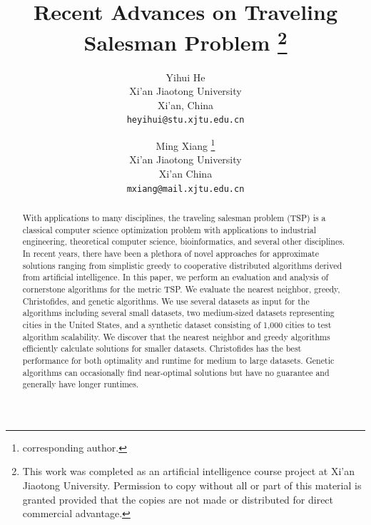 \documentclass[10pt,twocolumn,letterpaper]{article}
\begin{document}
\title{Recent Advances on Traveling Salesman Problem
\thanks{ This work was completed as an artificial intelligence course project at Xi'an Jiaotong University. Permission to copy without all or part of this material is granted provided that the copies are not made or distributed for direct commercial advantage.}
}

\author{Yihui He\\
Xi'an Jiaotong University\\
Xi'an, China\\
{\tt\small heyihui@stu.xjtu.edu.cn}
\and
Ming Xiang
\thanks{corresponding author.}\\
Xi'an Jiaotong University\\
Xi'an China\\
{\tt\small mxiang@mail.xjtu.edu.cn}
}

\maketitle

\begin{abstract}
With applications to many disciplines, the traveling salesman problem (TSP) is a classical computer science optimization problem with applications to industrial engineering, theoretical computer science, bioinformatics, and several other disciplines. In recent years, there have been a
plethora of novel approaches for approximate solutions ranging from simplistic greedy to cooperative distributed algorithms derived from artificial intelligence. In this paper,
we perform an evaluation and analysis of cornerstone algorithms for the metric TSP. We evaluate the nearest neighbor, greedy, Christofides, and genetic algorithms. We use
several datasets as input for the algorithms including several small datasets, two medium-sized datasets representing
cities in the United States, and a synthetic dataset consisting
of 1,000 cities to test algorithm scalability. We discover that
the nearest neighbor and greedy algorithms efficiently calculate solutions for smaller datasets. Christofides has the best
performance for both optimality and runtime for medium
to large datasets. Genetic algorithms can occasionally find
near-optimal solutions but have no guarantee and generally have longer runtimes.
\end{abstract}
\end{document}
